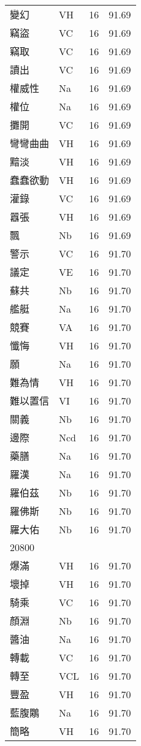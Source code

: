 \documentclass[twocolumn]{book}
\begin{document}
\begin{supertabular}{llrr}
變幻 & VH & 16 &  91.69\\
竊盜 & VC & 16 &  91.69\\
竊取 & VC & 16 &  91.69\\
讀出 & VC & 16 &  91.69\\
權威性 & Na & 16 &  91.69\\
權位 & Na & 16 &  91.69\\
攤開 & VC & 16 &  91.69\\
彎彎曲曲 & VH & 16 &  91.69\\
黯淡 & VH & 16 &  91.69\\
蠢蠢欲動 & VH & 16 &  91.69\\
灌錄 & VC & 16 &  91.69\\
囂張 & VH & 16 &  91.69\\
飄 & Nb & 16 &  91.69\\
警示 & VC & 16 &  91.70\\
議定 & VE & 16 &  91.70\\
蘇共 & Nb & 16 &  91.70\\
艦艇 & Na & 16 &  91.70\\
競賽 & VA & 16 &  91.70\\
懺悔 & VH & 16 &  91.70\\
願 & Na & 16 &  91.70\\
難為情 & VH & 16 &  91.70\\
難以置信 & VI & 16 &  91.70\\
關義 & Nb & 16 &  91.70\\
邊際 & Ncd & 16 &  91.70\\
藥膳 & Na & 16 &  91.70\\
羅漢 & Na & 16 &  91.70\\
羅伯茲 & Nb & 16 &  91.70\\
羅佛斯 & Nb & 16 &  91.70\\
羅大佑 & Nb & 16 &  91.70\\
20800\\
爆滿 & VH & 16 &  91.70\\
壞掉 & VH & 16 &  91.70\\
騎乘 & VC & 16 &  91.70\\
顏淵 & Nb & 16 &  91.70\\
醬油 & Na & 16 &  91.70\\
轉載 & VC & 16 &  91.70\\
轉至 & VCL & 16 &  91.70\\
豐盈 & VH & 16 &  91.70\\
藍腹鷴 & Na & 16 &  91.70\\
簡略 & VH & 16 &  91.70\\

\end{supertabular}
\end{document}
